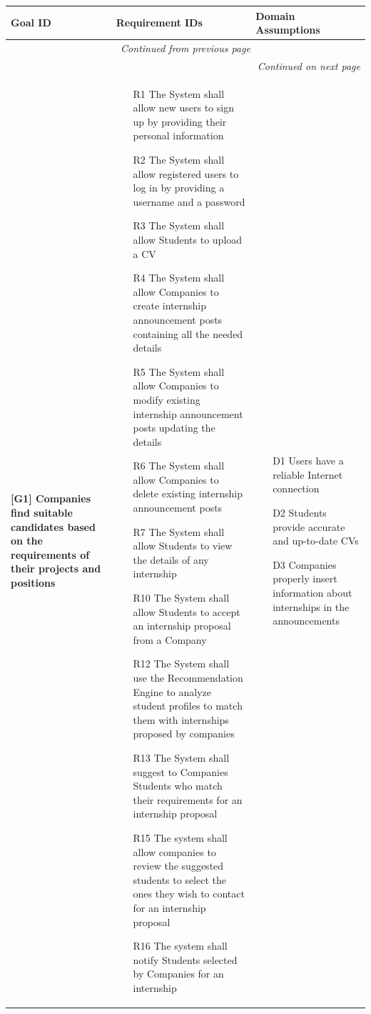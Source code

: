 \begin{longtable}{|p{4cm}|p{5.5cm}|p{5.5cm}|} %
    \hline
    \textbf{Goal ID} & \textbf{Requirement IDs} & \textbf{Domain Assumptions} \\ 
    \hline
    \endfirsthead
    \multicolumn{3}{c}{{\textit{Continued from previous page}}} \\ 
    \endhead
    \hline
    \multicolumn{3}{r}{{\textit{Continued on next page}}} \\
    \endfoot
    \hline
    \textbf{[G1] \newline Companies find suitable candidates based on the requirements of their projects and positions } & 
    \begin{itemize}[label=$\bullet$]
        \item [R1] The System shall allow new users to sign up by providing their personal information
        \item [R2] The System shall allow registered users to log in by providing a username and a password
        \item [R3] The System shall allow Students to upload a CV
        \item [R4] The System shall allow Companies to create internship announcement posts containing all the needed details
        \item [R5] The System shall allow Companies to modify existing internship announcement posts updating the details
        \item [R6] The System shall allow Companies to delete existing internship announcement posts
        \item [R7] The System shall allow Students to view the details of any internship
        \item [R10] The System shall allow Students to accept an internship proposal from a Company
        \item [R12] The System shall use the Recommendation Engine to analyze student profiles to match them with internships proposed by companies
        \item [R13] The System shall suggest to Companies Students who match their requirements for an internship proposal
        \item [R15] The system shall allow companies to review the suggested students to select the ones they wish to contact for an internship proposal
        \item [R16] The system shall notify Students selected by Companies for an internship
    \end{itemize}
    &
    \begin{itemize}[label=$\bullet$]
        \item [D1] Users have a reliable Internet connection
        \item [D2] Students provide accurate and up-to-date CVs
        \item [D3] Companies properly insert information about internships in the announcements
    \end{itemize} \\ 
    \hline
    

\end{longtable}
